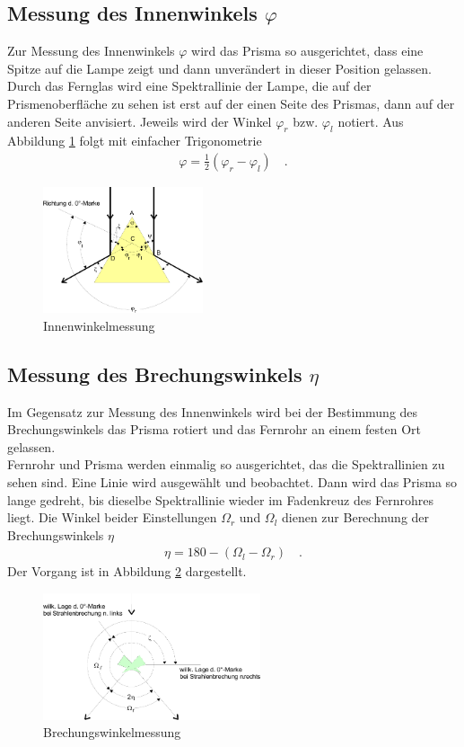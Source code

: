 \clearpage

\subsection{Messung des Innenwinkels $\varphi$}
Zur Messung des Innenwinkels $\varphi$ wird das Prisma so ausgerichtet, dass eine Spitze auf die Lampe zeigt und dann unverändert in dieser Position gelassen. Durch das Fernglas wird eine Spektrallinie der Lampe, die auf der Prismenoberfläche zu sehen ist erst auf der einen Seite des Prismas, dann auf der anderen Seite anvisiert. Jeweils wird der Winkel $\varphi_r$ bzw. $\varphi_l$ notiert. Aus Abbildung \ref{fig:prisma2} folgt mit einfacher Trigonometrie
\begin{align}\label{Phi}
	\varphi = \frac{1}{2} (\varphi_r - \varphi_l) \quad.
\end{align}

\begin{figure}[h!]
	\centering
	\includegraphics[width=0.42\textwidth]{Prisma2.png}
	\caption{Innenwinkelmessung}
	\label{fig:prisma2}
\end{figure}

\subsection{Messung des Brechungswinkels $\eta$}
Im Gegensatz zur Messung des Innenwinkels wird bei der Bestimmung des Brechungswinkels das Prisma rotiert und das Fernrohr an einem festen Ort gelassen. \\
Fernrohr und Prisma werden einmalig so ausgerichtet, das die Spektrallinien zu sehen sind. Eine Linie wird ausgewählt und beobachtet. Dann wird das Prisma so lange gedreht, bis dieselbe Spektrallinie wieder im Fadenkreuz des Fernrohres liegt. Die Winkel beider Einstellungen $\Omega_r$ und $\Omega_l$ dienen zur Berechnung der Brechungswinkels $\eta$
\begin{align}\label{Eta}
	\eta = 180 - (\Omega_l - \Omega_r) \quad .
\end{align}
Der Vorgang ist in Abbildung \ref{fig:prisma3} dargestellt.

\begin{figure}[h!]
	\centering
	\includegraphics[width=0.57\textwidth]{Prisma3.png}
	\caption{Brechungswinkelmessung}
	\label{fig:prisma3}
\end{figure}

